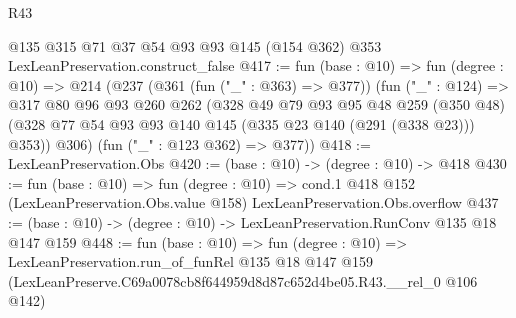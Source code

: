 \begin{lexlean}{R43}
\begin{coremodule}
    @135
    @315
    @71
    @37
    @54
    @93
    @93
    @145
    (@154 @362)
    @353
    LexLeanPreservation.construct_false
@417 := fun (base : @10) =>
  fun (degree : @10) =>
  @214
    (@237
      (@361 (fun ("_" : @363) => @377))
      (fun ("_" : @124) =>
      @317
        @80
        @96
        @93
        @260
        @262
        (@328
          @49
          @79
          @93
          @95
          @48
          @259
          (@350 @48)
          (@328 @77 @54 @93 @93 @140 @145 (@335 @23 @140 (@291 (@338 @23))) @353))
        @306)
      (fun ("_" : @123 @362) => @377))
@418 := LexLeanPreservation.Obs
@420 := (base : @10) -> (degree : @10) -> @418
@430 := fun (base : @10) =>
  fun (degree : @10) =>
  cond.{1} @418 @152 (LexLeanPreservation.Obs.value @158) LexLeanPreservation.Obs.overflow
@437 := (base : @10) -> (degree : @10) -> LexLeanPreservation.RunConv @135 @18 @147 @159
@448 := fun (base : @10) =>
  fun (degree : @10) =>
  LexLeanPreservation.run_of_funRel
    @135
    @18
    @147
    @159
    (LexLeanPreserve.C69a0078cb8f644959d8d87c652d4be05.R43.__rel_0 @106 @142)
\end{coremodule}
\end{lexlean}
